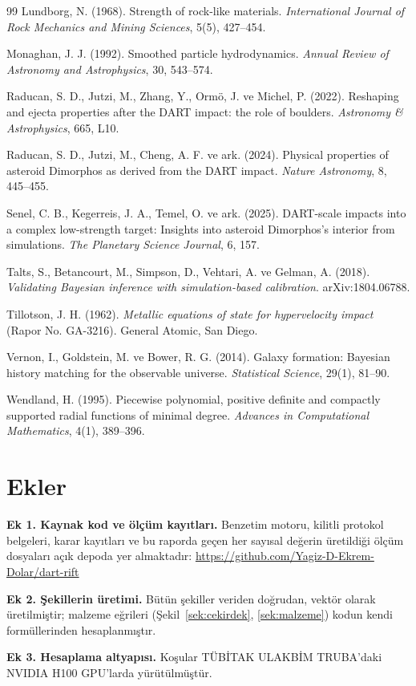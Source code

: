 \documentclass[12pt,a4paper]{article}
\begin{document}
\begin{thebibliography}{99}
Lundborg, N. (1968). Strength of rock-like materials.
\emph{International Journal of Rock Mechanics and Mining Sciences}, 5(5),
427--454.

Monaghan, J. J. (1992). Smoothed particle hydrodynamics. \emph{Annual
Review of Astronomy and Astrophysics}, 30, 543--574.

Raducan, S. D., Jutzi, M., Zhang, Y., Ormö, J. ve Michel, P. (2022).
Reshaping and ejecta properties after the DART impact: the role of
boulders. \emph{Astronomy \& Astrophysics}, 665, L10.

Raducan, S. D., Jutzi, M., Cheng, A. F. ve ark. (2024). Physical
properties of asteroid Dimorphos as derived from the DART impact.
\emph{Nature Astronomy}, 8, 445--455.

Senel, C. B., Kegerreis, J. A., Temel, O. ve ark. (2025). DART-scale
impacts into a complex low-strength target: Insights into asteroid
Dimorphos's interior from simulations. \emph{The Planetary Science
Journal}, 6, 157.

Talts, S., Betancourt, M., Simpson, D., Vehtari, A. ve Gelman, A. (2018).
\emph{Validating Bayesian inference with simulation-based calibration}.
arXiv:1804.06788.

Tillotson, J. H. (1962). \emph{Metallic equations of state for
hypervelocity impact} (Rapor No. GA-3216). General Atomic, San Diego.

Vernon, I., Goldstein, M. ve Bower, R. G. (2014). Galaxy formation:
Bayesian history matching for the observable universe. \emph{Statistical
Science}, 29(1), 81--90.

Wendland, H. (1995). Piecewise polynomial, positive definite and
compactly supported radial functions of minimal degree. \emph{Advances in
Computational Mathematics}, 4(1), 389--396.

\end{thebibliography}

\section*{Ekler}

\noindent\textbf{Ek 1. Kaynak kod ve ölçüm kayıtları.} Benzetim motoru,
kilitli protokol belgeleri, karar kayıtları ve bu raporda geçen her
sayısal değerin üretildiği ölçüm dosyaları açık depoda yer almaktadır:
\url{https://github.com/Yagiz-D-Ekrem-Dolar/dart-rift}

\noindent\textbf{Ek 2. Şekillerin üretimi.} Bütün şekiller veriden
doğrudan, vektör olarak üretilmiştir; malzeme eğrileri
(Şekil~\ref{sek:cekirdek}, \ref{sek:malzeme}) kodun kendi
formüllerinden hesaplanmıştır.

\noindent\textbf{Ek 3. Hesaplama altyapısı.} Koşular TÜBİTAK ULAKBİM
TRUBA'daki NVIDIA H100 GPU'larda yürütülmüştür.
\end{document}
